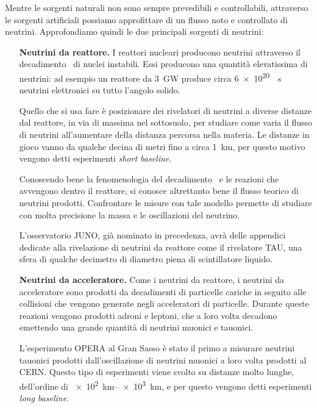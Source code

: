         Mentre le sorgenti naturali non sono sempre prevedibili e controllabili, attraverso le sorgenti artificiali possiamo approfittare di un flusso noto e controllato di neutrini. Approfondiamo quindi le due principali sorgenti di neutrini:
        \begin{enumerate}[wide = 0pt, leftmargin = 1.5\parindent]
            \item[\textbf{Neutrini da reattore.}] I reattori nucleari producono neutrini attraverso il decadimento \betap\ di nuclei instabili. Essi producono una quantità elevatissima di neutrini: ad esempio un reattore da \SI{3}{\giga\watt} produce circa \SI{6e+20}{\per\second} neutrini elettronici su tutto l'angolo solido.
            
            Quello che si usa fare è posizionare dei rivelatori di neutrini a diverse distanze dal reattore, in via di massima nel sottosuolo, per studiare come varia il flusso di neutrini all'aumentare della distanza percorsa nella materia. Le distanze in gioco vanno da qualche decina di metri fino a circa \SI{1}{\kilo\meter}, per questo motivo vengono detti esperimenti \emph{short baseline}.

            Conoscendo bene la fenomenologia del decadimento \betap\ e le reazioni che avvengono dentro il reattore, si conosce altrettanto bene il flusso teorico di neutrini prodotti. Confrontare le misure con tale modello permette di studiare con molta precisione la massa e le oscillazioni del neutrino.

            L'osservatorio JUNO, già nominato in precedenza, avrà delle appendici dedicate alla rivelazione di neutrini da reattore come il rivelatore TAU, una sfera di qualche decimetro di diametro piena di scintillatore liquido.

            \item[\textbf{Neutrini da acceleratore.}] Come i neutrini da reattore, i neutrini da acceleratore sono prodotti da decadimenti di particelle cariche in seguito alle collisioni che vengono generate negli acceleratori di particelle. Durante queste reazioni vengono prodotti adroni e leptoni, che a loro volta decadono emettendo una grande quantità di neutrini muonici e tauonici.
            
            L'esperimento OPERA al Gran Sasso è stato il primo a misurare neutrini tauonici prodotti dall'oscillazione di neutrini muonici a loro volta prodotti al CERN. Questo tipo di esperimenti viene svolto su distanze molto lunghe, dell'ordine di \SI{e+2}{\kilo\meter}--\SI{e+3}{\kilo\meter}, e per questo vengono detti esperimenti \emph{long baseline}. 
        \end{enumerate}



